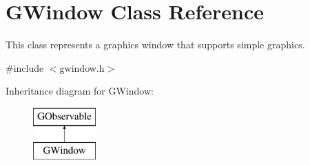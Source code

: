 \hypertarget{classsgl_1_1GWindow}{}\section{G\+Window Class Reference}
\label{classsgl_1_1GWindow}


This class represents a graphics window that supports simple graphics.  




{\ttfamily \#include $<$gwindow.\+h$>$}

Inheritance diagram for G\+Window\+:\begin{figure}[H]
\begin{center}
\leavevmode
\includegraphics[height=2.000000cm]{classsgl_1_1GWindow}
\end{center}
\end{figure}
